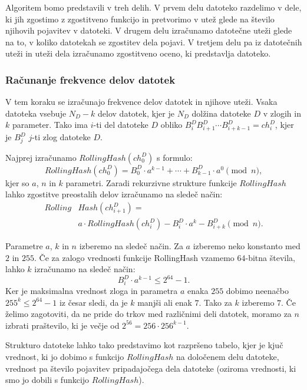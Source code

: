 \documentclass{acm_proc_article-sp}
\begin{document}
Algoritem bomo predstavili v treh delih. V prvem delu datoteko razdelimo v dele, ki jih zgostimo z zgostitveno funkcijo in pretvorimo v utež glede na število njihovih pojavitev v datoteki. V drugem delu izračunamo datotečne uteži glede na to, v koliko datotekah se zgostitev dela pojavi. V tretjem delu pa iz datotečnih uteži in uteži dela izračunamo zgostitveno oceno, ki predstavlja datoteko.

\subsubsection{Računanje frekvence delov datotek}

V tem koraku se izračunajo frekvence delov datotek in njihove uteži. Vsaka datoteka vsebuje $N_D - k$ delov datotek, kjer je $N_D$ dolžina datoteke $D$ v zlogih in $k$ parameter. Tako ima $i$-ti del datoteke $D$ obliko $B_{i}^{D}B_{i+1}^{D} \cdots B_{i+k-1}^{D} = ch_{i}^D$, kjer je $B_{j}^{D}$ $j$-ti zlog datoteke $D$.

Najprej izračunamo $RollingHash(ch_{0}^D)$ s formulo: 
\[RollingHash(ch_{0}^D) = B_{0}^{D} \cdot a^{k-1} + \cdots + B_{k-1}^{D} \cdot a^0 \pmod n,\]
kjer so $a$, $n$ in $k$ parametri. Zaradi rekurzivne strukture funkcije $RollingHash$ lahko zgostitve preostalih delov izračunamo na sledeč način:
\begin{align*}
Rolling&Hash(ch_{i+1}^D) = \\
&a \cdot RollingHash(ch_{i}^D)-B_{i}^{D} \cdot a^{k}-B_{i+k}^D \pmod n.
\end{align*}

Parametre $a$, $k$ in $n$ izberemo na sledeč način. Za $a$ izberemo neko konstanto med $2$ in $255$. Če za zalogo vrednosti funkcije RollingHash vzamemo $64$-bitna števila, lahko $k$ izračunamo na sledeč način: \begin{displaymath}  B_{i}^{D} \cdot a^{k-1} \leq 2^{64}-1.\end{displaymath} Ker je maksimalna vrednost zloga in parametra $a$ enaka $255$ dobimo neenačbo $255^k \leq 2^{64}-1$ iz česar sledi, da je $k$ manjši ali enak $7$. Tako za $k$ izberemo $7$. Če želimo zagotoviti, da ne pride do trkov med različnimi deli datotek, moramo za $n$ izbrati praštevilo, ki je večje od $2^{56}=256\cdot 256^{k-1}$. 

Strukturo datoteke lahko tako predstavimo kot razpršeno tabelo, kjer je kjuč vrednost, ki jo dobimo s funkcijo $RollingHash$ na določenem delu datoteke, vrednost pa število pojavitev pripadajočega dela datoteke (oziroma vrednosti, ki smo jo dobili s funkcijo $RollingHash$).
\end{document}

